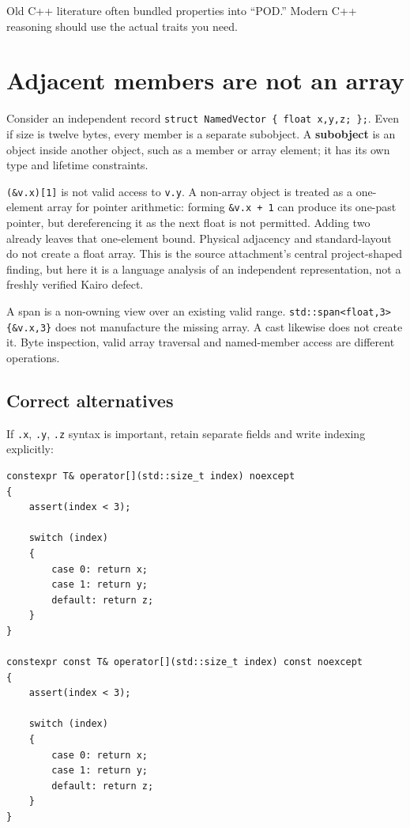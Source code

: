 Old C++ literature often bundled properties into ``POD.'' Modern C++ reasoning should use the actual traits you need.

\section{Adjacent members are not an array}\label{01-foundations-i-ch003-adjacent-members-are-not-an-array}

Consider an independent record \texttt{struct\ NamedVector\ \{\ float\ x,y,z;\ \};}. Even if size is twelve bytes, every member is a separate subobject. A \textbf{subobject} is an object inside another object, such as a member or array element; it has its own type and lifetime constraints.

\texttt{(\&v.x){[}1{]}} is not valid access to \texttt{v.y}. A non-array object is treated as a one-element array for pointer arithmetic: forming \texttt{\&v.x\ +\ 1} can produce its one-past pointer, but dereferencing it as the next float is not permitted. Adding two already leaves that one-element bound. Physical adjacency and standard-layout do not create a float array. This is the source attachment's central project-shaped finding, but here it is a language analysis of an independent representation, not a freshly verified Kairo defect.

A span is a non-owning view over an existing valid range. \texttt{std::span\textless{}float,3\textgreater{}\{\&v.x,3\}} does not manufacture the missing array. A cast likewise does not create it. Byte inspection, valid array traversal and named-member access are different operations.

\subsection{Correct alternatives}\label{01-foundations-i-ch003-correct-alternatives}

If \texttt{.x}, \texttt{.y}, \texttt{.z} syntax is important, retain separate fields and write indexing explicitly:

\begin{verbatim}
constexpr T& operator[](std::size_t index) noexcept
{
    assert(index < 3);

    switch (index)
    {
        case 0: return x;
        case 1: return y;
        default: return z;
    }
}

constexpr const T& operator[](std::size_t index) const noexcept
{
    assert(index < 3);

    switch (index)
    {
        case 0: return x;
        case 1: return y;
        default: return z;
    }
}
\end{verbatim}

